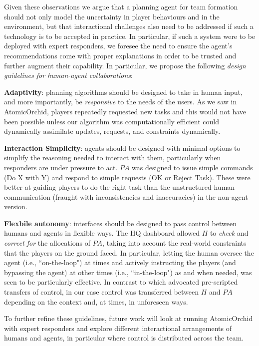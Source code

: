 Given these observations we argue that a planning agent for team formation should not only model the uncertainty in player behaviours and in the environment, but that interactional challenges also need to be addressed  if such a technology is to be accepted in practice. In particular, if such a system were to be deployed with expert responders, we foresee the need to ensure the agent's recommendations come with proper explanations in order to be trusted and further augment their capability. In particular, we propose the following \textit{design guidelines for human-agent collaborations}:

\noindent \textbf{Adaptivity}:  planning algorithms should be designed to take in human input, and more importantly, be \emph{responsive} to the needs of the users. As we saw in AtomicOrchid, players repeatedly requested new tasks and this would not have been possible unless our algorithm  was computationally efficient  could dynamically assimilate updates, requests, and constraints dynamically. 

\noindent \textbf{Interaction Simplicity}:  agents should be designed with minimal options to simplify the reasoning needed to interact with them, particularly when responders are under pressure to act. $PA$ was designed to issue simple commands (Do X with Y) and respond to simple requests (OK or Reject Task). These were better at guiding players to do the right task than the unstructured human communication (fraught with inconsistencies and inaccuracies) in the non-agent version. 

\noindent \textbf{Flexbile autonomy}: interfaces should be designed to pass control between humans and agents in flexible ways. The HQ dashboard allowed $H$ to \emph{check} and \emph{correct for} the allocations of $PA$, taking into account the real-world constraints that the players on the ground faced. In particular, letting the human oversee the agent (i.e., ``on-the-loop") at times and actively instructing  the players (and bypassing the agent) at other times (i.e., ``in-the-loop") as and when needed, was seen to be particularly effective. In contrast to \cite{scerri:etal:2005} which advocated pre-scripted transfers of control, in our case  control was transferred between $H$ and $PA$ depending on the context and, at times, in unforeseen ways.

To further refine these guidelines, future work will look at running AtomicOrchid with expert responders and explore different interactional arrangements of humans and agents, in particular where control is distributed across the team.\vspace{-1mm}